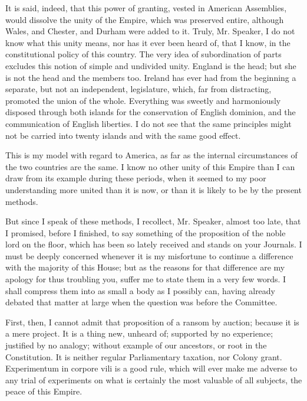 It is said, indeed, that this power of granting, vested in American Assemblies, would dissolve the unity of the Empire, which was preserved entire, although Wales, and Chester, and Durham were added to it. Truly, Mr. Speaker, I do not know what this unity means, nor has it ever been heard of, that I know, in the constitutional policy of this country. The very idea of subordination of parts excludes this notion of simple and undivided unity. England is the head; but she is not the head and the members too. Ireland has ever had from the beginning a separate, but not an independent, legislature, which, far from distracting, promoted the union of the whole. Everything was sweetly and harmoniously disposed through both islands for the conservation of English dominion, and the communication of English liberties. I do not see that the same principles might not be carried into twenty islands and with the same good effect.\par

This is my model with regard to America, as far as the internal circumstances of the two countries are the same. I know no other unity of this Empire than I can draw from its example during these periods, when it seemed to my poor understanding more united than it is now, or than it is likely to be by the present methods.\par

But since I speak of these methods, I recollect, Mr. Speaker, almost too late, that I promised, before I finished, to say something of the proposition of the noble lord on the floor, which has been so lately received and stands on your Journals. I must be deeply concerned whenever it is my misfortune to continue a difference with the majority of this House; but as the reasons for that difference are my apology for thus troubling you, suffer me to state them in a very few words. I shall compress them into as small a body as I possibly can, having already debated that matter at large when the question was before the Committee.\par

First, then, I cannot admit that proposition of a ransom by auction; because it is a mere project. It is a thing new, unheard of; supported by no experience; justified by no analogy; without example of our ancestors, or root in the Constitution. It is neither regular Parliamentary taxation, nor Colony grant. Experimentum in corpore vili is a good rule, which will ever make me adverse to any trial of experiments on what is certainly the most valuable of all subjects, the peace of this Empire.\par

